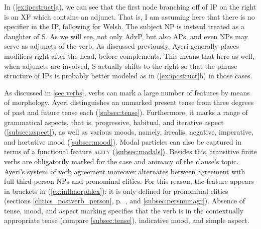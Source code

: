 In (\ref{ex:ipcstruct}a), we can see that the first node branching off of IP on
the right is an XP which contains an adjunct. That is, I am assuming here that
there is no specifier in the IP, following \citet[130]{bresnan2016} for Welsh.
The subject NP is instead treated as a daughter of S. As we will see, not only
AdvP, but also APs, and even NPs may serve as adjuncts of the verb. As discussed previously, Ayeri
generally places modifiers right after the head, before complements. This means
that here as well, when adjuncts are involved, S actually shifts to the right
so that the phrase structure of IPs is probably better modeled as in 
(\ref{ex:ipcstruct}b) in those cases.

As discussed in \autoref{sec:verbs}, verbs can mark a large number of features
by means of morphology. Ayeri distinguishes an unmarked present tense from
three degrees of past and future tense each (\autoref{subsec:tense}).
Furthermore, it marks a range of grammatical aspects, that is, progressive,
habitual, and iterative aspect (\autoref{subsec:aspect}), as well as various
moods, namely, irrealis, negative, imperative, and hortative mood
(\autoref{subsec:mood}). Modal particles can also be captured in terms of a
functional feature \Mod\textsc{ality} (\autoref{subsec:modals}). Besides this,
transitive finite verbs are obligatorily marked for the case and animacy of the
clause's topic. Ayeri's system of verb agreement moreover alternates between
agreement with full third-person NPs and pronominal clitics. For this reason,
the feature \ups{\Subj{} \Pred} appears in brackets in (\ref{ex:inflmorphlex}):
it is only defined for pronominal clitics (sections
\ref{clitics_postverb_person}, p.~\pageref{clitics_postverb_person}, and
\ref{subsec:persnumagr}). Absence of tense, mood, and aspect marking specifies
that the verb is in the contextually appropriate tense (compare
\autoref{subsec:tense}), indicative mood, and simple aspect.

